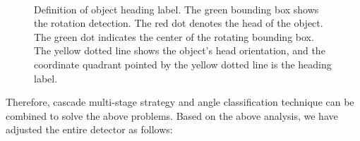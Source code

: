 \documentclass[10pt,journal,compsoc]{IEEEtran}
\begin{document}
\begin{figure}[!tb]
	\centering
	\\ \vspace{-5pt}
	\centering
	\caption{Definition of object heading label. The green bounding box shows the  rotation detection. The red dot denotes the head of the object. The green dot indicates the center of the rotating bounding box. The yellow dotted line shows the object's head orientation, and the coordinate quadrant pointed by the yellow dotted line is the heading label.}
	\label{fig:head_label}
\end{figure}

Therefore, cascade multi-stage strategy and angle classification technique can be combined to solve the above problems. Based on the above analysis, we have adjusted the entire detector as follows:
\end{document}
